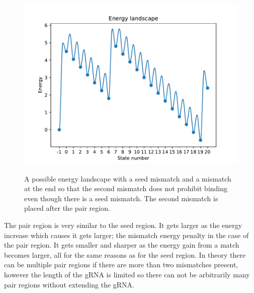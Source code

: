 \begin{figure}[H]
\begin{center}
\includegraphics[width=\textwidth]{images/pairexample3}
\label{fig:pairexample3}
\caption{A possible energy landscape with a seed mismatch and a mismatch at the end so that the second mismatch does not prohibit binding even though there is a seed mismatch. The second mismatch is placed after the pair region.}
\end{center}
\end{figure}

The pair region is very similar to the seed region. It gets larger as the energy increase which causes it gets larger; the mismatch energy penalty in the case of the pair region. It gets smaller and sharper as the energy gain from a match becomes larger, all for the same reasons as for the seed region. In theory there can be multiple pair regions if there are more than two mismatches present, however the length of the gRNA is limited so there can not be arbitrarily many pair regions without extending the gRNA.























